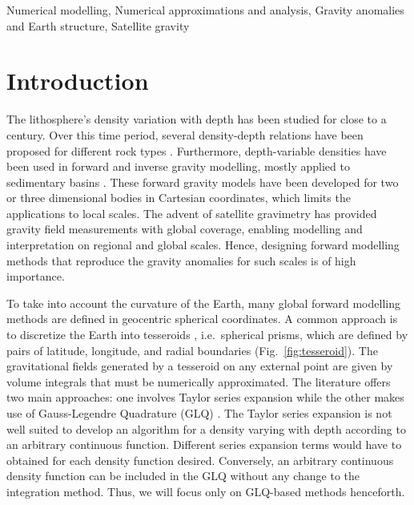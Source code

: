 \documentclass[extra, referee]{gji}
\begin{document}
\begin{keywords}
Numerical modelling, Numerical approximations and analysis, Gravity anomalies
and Earth structure, Satellite gravity
\end{keywords}


\section{Introduction}

The lithosphere's density variation with depth has been studied for close to a
century.
Over this time period,
several density-depth relations have been proposed for different rock types
\citep[e.g.][]{Maxant1980, Rao1986, Rao1993, Rao1994}.
Furthermore, depth-variable densities have been used in forward and
inverse gravity modelling, mostly applied to sedimentary basins
\citep{Cordell1973, Rao1986, Cowie1990, Rao1993, Rao1994, Zhang2001,
Welford2010}.
These forward gravity models have been developed for two or three dimensional
bodies in Cartesian coordinates, which limits the applications to local scales.
The advent of satellite gravimetry has provided gravity field
measurements with global coverage, enabling modelling and interpretation on regional and
global scales.
Hence, designing forward modelling methods that reproduce the gravity anomalies for
such scales is of high importance.

To take into account the curvature of the Earth, many global forward modelling methods
are defined in geocentric spherical coordinates.
A common approach is to discretize the Earth into tesseroids \citep{Anderson1976},
i.e.~spherical prisms, which are defined by pairs of latitude, longitude, and radial
boundaries (Fig.~\ref{fig:tesseroid}).
The gravitational fields generated by a
tesseroid on any external point are given by volume
integrals that must be numerically approximated.
The literature offers two main approaches: one involves Taylor series expansion
\citep{Heck2007, Grombein2013} while the other makes use of Gauss-Legendre
Quadrature (GLQ)
\citep{Asgharzadeh2007, Wild-Pfeiffer2008, Li2011, Uieda2016, Lin2018}.
The Taylor series expansion is not well suited to develop an algorithm for
a density varying with depth according to an arbitrary continuous function.
Different series expansion terms would have to obtained for each density function
desired.
Conversely, an arbitrary continuous density function can be included in the GLQ without
any change to the integration method.
Thus, we will focus only on GLQ-based methods henceforth.
\end{document}
